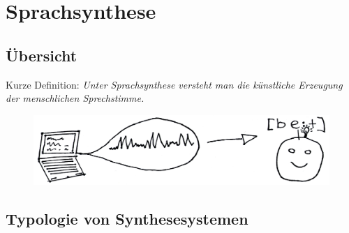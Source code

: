 \documentclass[11pt]{book}
\begin{document}










\chapter{Sprachsynthese}


  \section{Übersicht}
  
  Kurze Definition: \emph{Unter Sprachsynthese versteht man die künstliche Erzeugung der menschlichen Sprechstimme.}

\begin{figure}[htbp]
\begin{center}
\includegraphics[width=\textwidth]{grafiken/sprachsynthese/synthese}
\label{ts}
\end{center}
\end{figure}
  \section{Typologie von Synthesesystemen}
\end{document}
